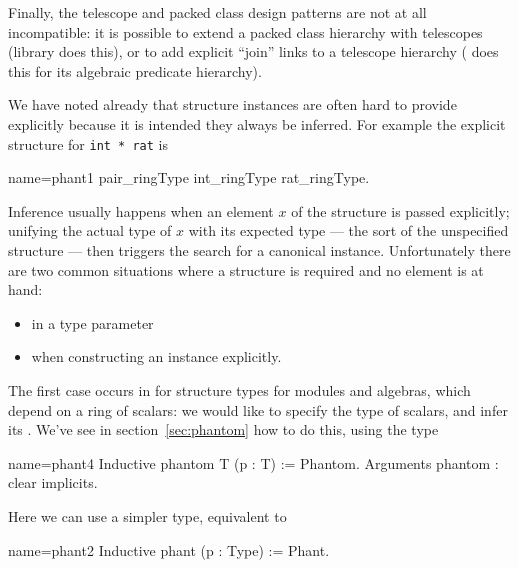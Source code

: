 Finally, the telescope and packed class design patterns are not
at all incompatible: it is possible to extend a packed class
hierarchy with telescopes (library  does this), or to add
explicit ``join'' links to a telescope hierarchy ( does this
for its algebraic predicate hierarchy).

\label{sec:phant}

We have noted already that structure instances are often hard to
provide explicitly because it is intended they always be inferred.
For example the explicit  structure for \lstinline/int * rat/ is

\begin{coq}{name=phant1}{}
pair_ringType int_ringType rat_ringType.
\end{coq}

Inference usually happens when an element $x$ of the structure is
passed explicitly; unifying the actual type of $x$ with its expected
type --- the sort of the unspecified structure --- then triggers the
search for a canonical instance.
Unfortunately there are two common situations where a structure is
required and no element is at hand:
\begin{itemize}
\item in a type parameter
\item when constructing an instance explicitly.
\end{itemize}
The first case occurs in  for structure types for modules
and algebras, which depend on a ring of scalars: we would like to
specify the type of scalars, and infer its .  We've see in
section~\ref{sec:phantom} how to do this, using the  type

\begin{coq}{name=phant4}{}
Inductive phantom T (p : T) := Phantom.
Arguments phantom : clear implicits.
\end{coq}

Here we can use a simpler type, equivalent to 

\begin{coq}{name=phant2}{}
Inductive phant (p : Type) := Phant.
\end{coq}

